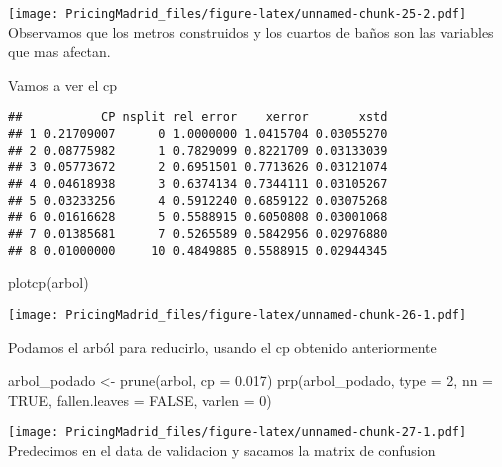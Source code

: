 \documentclass[
]{article}
\newenvironment{Shaded}{\begin{snugshade}}{\end{snugshade}}
\newcommand{\AttributeTok}[1]{\textcolor[rgb]{0.77,0.63,0.00}{#1}}
\newcommand{\ConstantTok}[1]{\textcolor[rgb]{0.00,0.00,0.00}{#1}}
\newcommand{\DecValTok}[1]{\textcolor[rgb]{0.00,0.00,0.81}{#1}}
\newcommand{\FloatTok}[1]{\textcolor[rgb]{0.00,0.00,0.81}{#1}}
\newcommand{\FunctionTok}[1]{\textcolor[rgb]{0.00,0.00,0.00}{#1}}
\newcommand{\NormalTok}[1]{#1}
\newcommand{\OtherTok}[1]{\textcolor[rgb]{0.56,0.35,0.01}{#1}}
\newcommand{\SpecialCharTok}[1]{\textcolor[rgb]{0.00,0.00,0.00}{#1}}
\begin{document}
\texttt{[image: PricingMadrid\_files/figure-latex/unnamed-chunk-25-2.pdf]}
Observamos que los metros construidos y los cuartos de baños son las
variables que mas afectan.

Vamos a ver el cp

\begin{Shaded}
\end{Shaded}

\begin{verbatim}
##           CP nsplit rel error    xerror       xstd
## 1 0.21709007      0 1.0000000 1.0415704 0.03055270
## 2 0.08775982      1 0.7829099 0.8221709 0.03133039
## 3 0.05773672      2 0.6951501 0.7713626 0.03121074
## 4 0.04618938      3 0.6374134 0.7344111 0.03105267
## 5 0.03233256      4 0.5912240 0.6859122 0.03075268
## 6 0.01616628      5 0.5588915 0.6050808 0.03001068
## 7 0.01385681      7 0.5265589 0.5842956 0.02976880
## 8 0.01000000     10 0.4849885 0.5588915 0.02944345
\end{verbatim}

\begin{Shaded}
\begin{Highlighting}[]
\FunctionTok{plotcp}\NormalTok{(arbol)}
\end{Highlighting}
\end{Shaded}

\texttt{[image: PricingMadrid\_files/figure-latex/unnamed-chunk-26-1.pdf]}

Podamos el arból para reducirlo, usando el cp obtenido anteriormente

\begin{Shaded}
\begin{Highlighting}[]
\NormalTok{arbol\_podado }\OtherTok{\textless{}{-}} \FunctionTok{prune}\NormalTok{(arbol, }\AttributeTok{cp =} \FloatTok{0.017}\NormalTok{)}
\FunctionTok{prp}\NormalTok{(arbol\_podado, }\AttributeTok{type =} \DecValTok{2}\NormalTok{, }\AttributeTok{nn =} \ConstantTok{TRUE}\NormalTok{, }
    \AttributeTok{fallen.leaves =} \ConstantTok{FALSE}\NormalTok{,}
    \AttributeTok{varlen =} \DecValTok{0}\NormalTok{)}
\end{Highlighting}
\end{Shaded}

\texttt{[image: PricingMadrid\_files/figure-latex/unnamed-chunk-27-1.pdf]}
Predecimos en el data de validacion y sacamos la matrix de confusion
\end{document}
